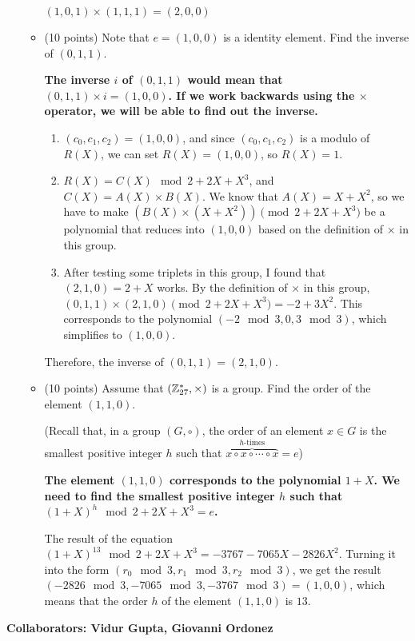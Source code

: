 \documentclass[11pt]{article}
\begin{document}
\begin{enumerate}
\begin{itemize}
{      $(1,0,1) \times (1,1,1) = (2,0,0)$
  }
    \newpage
  \item (10 points) Note that $e=(1,0,0)$ is a identity element. Find the inverse of $(0,1,1)$.
  \newline
  {\bfseries
      \newline
      \newline
      The inverse $i$ of $(0,1,1)$ would mean that $(0,1,1) \times i = (1,0,0)$. \newline
      If we work backwards using the $\times$ operator, we will be able to find out the inverse. \newline
      \begin{enumerate}
        \item $(c_0,c_1,c_2) = (1,0,0)$, and since $(c_0,c_1,c_2)$ is a modulo of $R(X)$, we can set $R(X) = (1,0,0)$, so $R(X) = 1$.
        \item $R(X) = C(X)\mod 2+2X+X^3$, and $C(X) = A(X) \times B(X)$. We know that $A(X) = X+X^2$, so we have to make $(B(X) \times (X+X^2)) \pmod {2+2X+X^3}$ be a polynomial that reduces into $(1,0,0)$ based on the definition of $\times$ in this group.
        \item After testing some triplets in this group, I found that $(2,1,0) = 2+X$ works. By the definition of $\times$ in this group, $(0,1,1) \times (2,1,0) \pmod {2+2X+X^3} = -2+3X^2$. This corresponds to the polynomial $(-2\mod 3,0,3\mod 3)$, which simplifies to $(1,0,0)$.\newline
      \end{enumerate}
      Therefore, the inverse of $(0,1,1) = (2,1,0)$.
  }
    \newpage
  
  \item (10 points) Assume that $({\mathbb Z}_{27}^*,\times)$ is a group. 
    Find the order of the element $(1,1,0)$. 
  
    (Recall that, in a group $(G,\circ)$, the order of an element $x\in G$ is the smallest positive integer $h$ such that $\overbrace{x\circ x \circ \dotsi \circ x}^{h\text{-times}} = e$)
    \newline
  {\bfseries
      \newline
      \newline
      The element $(1,1,0)$ corresponds to the polynomial $1+X$. We need to find the smallest positive integer $h$ such that $(1+X)^h \mod 2+2X+X^3=e$. \newline

      The result of the equation $(1+X)^{13} \mod 2+2X+X^3 = -3767-7065X-2826X^2$. Turning it into the form $(r_0\mod 3, r_1\mod 3, r_2\mod 3)$, we get the result $(-2826\mod 3, -7065\mod 3, -3767\mod 3) = (1,0,0)$, which means that the order $h$ of the element $(1,1,0)$ is $13$.
  }
    \newpage
  \end{itemize}

\end{enumerate}
\newpage


{\bfseries Collaborators: Vidur Gupta, Giovanni Ordonez} \newline 
\end{document}
